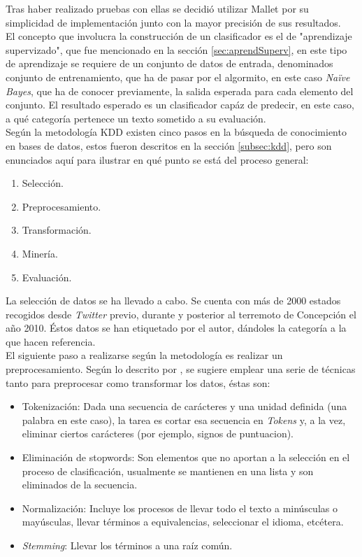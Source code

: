 Tras haber realizado pruebas con ellas se decidió utilizar Mallet por su simplicidad de implementación junto con la mayor precisión de sus resultados.\\

El concepto que involucra la construcción de un clasificador es el de "aprendizaje supervizado", que fue mencionado en la sección \ref{sec:aprendSuperv}, en este tipo de aprendizaje se requiere de un conjunto de datos de entrada, denominados conjunto de entrenamiento, que ha de pasar por el algormito, en este caso \textit{Naïve Bayes}, que ha de conocer previamente, la salida esperada para cada elemento del conjunto. El resultado esperado es un clasificador capáz de predecir, en este caso, a qué categoría pertenece un texto sometido a su evaluación.\\

Según la metodología KDD existen cinco pasos en la búsqueda de conocimiento en bases de datos, estos fueron descritos en la sección \ref{subsec:kdd}, pero son enunciados aquí para ilustrar en qué punto se está del proceso general:

\begin{enumerate}
\item Selección.
\item Preprocesamiento.
\item Transformación.
\item Minería.
\item Evaluación.
\end{enumerate}

La selección de datos se ha llevado a cabo. Se cuenta con más de 2000 estados recogidos desde \textit{Twitter} previo, durante y posterior al terremoto de Concepción el año 2010. Éstos datos se han etiquetado por el autor, dándoles la categoría a la que hacen referencia.\\

El siguiente paso a realizarse según la metodología es realizar un preprocesamiento. Según lo descrito por \cite{IRQE}, se sugiere emplear una serie de técnicas tanto para preprocesar como transformar los datos, éstas son:

\begin{itemize}
\item Tokenización: Dada una secuencia de carácteres y una unidad definida (una palabra en este caso), la tarea es cortar esa secuencia en \textit{Tokens} y, a la vez, eliminar ciertos carácteres (por ejemplo, signos de puntuacion).
\item Eliminación de stopwords: Son elementos que no aportan a la selección en el proceso de clasificación, usualmente se mantienen en una lista y son eliminados de la secuencia.
\item Normalización: Incluye los procesos de llevar todo el texto a minúsculas o mayúsculas, llevar términos a equivalencias, seleccionar el idioma, etcétera.
\item \textit{Stemming}: Llevar los términos a una raíz común.
\end{itemize}

